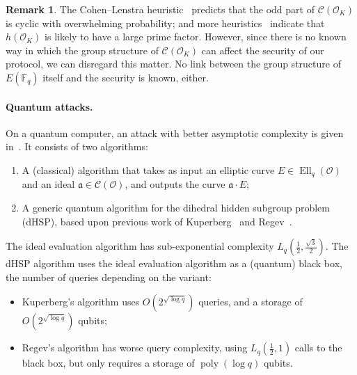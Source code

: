 \documentclass{article}
\newcommand{\F}{\mathbb{F}}
\newcommand{\Cl}{\mathcal{C}}
\renewcommand{\O}{\mathcal{O}}
\renewcommand{\frak}{\mathfrak}
\theoremstyle{definition}
\newtheorem{remark}[theorem]{Remark}
\DeclareMathOperator{\Ell}{Ell}
\DeclareMathOperator{\poly}{poly}
\begin{document}
\begin{remark}
  The Cohen--Lenstra heuristic~\cite{10.1007/BFb0099440} predicts that
  the odd part of $\Cl(\O_K)$ is cyclic with overwhelming
  probability; and more heuristics~\cite{10.1007/3-540-44448-3_18}
  indicate that $h(\O_K)$ is likely to have a large prime factor.
  However, since there is no known way in which the group structure of
  $\Cl(\O_K)$ can affect the security of our protocol, we can 
  disregard this matter. No link between the group structure
	of $E(\F_q)$ itself and the security is known, either.
\end{remark}

\paragraph{Quantum attacks.}
On a quantum computer, an attack with better asymptotic complexity is
given in~\cite{childs2014constructing}. It consists of two algorithms:
\begin{enumerate}
\item A (classical) algorithm that takes as input an elliptic curve
  $E∈\Ell_q(\O)$ and an ideal $\frak a∈\Cl(\O)$, and outputs the curve
  $\frak a·E$;
\item A generic quantum algorithm for the dihedral hidden subgroup
  problem (dHSP), based upon previous work of Kuperberg~\cite{Kup} and
  Regev~\cite{regev04}.
\end{enumerate}

The ideal evaluation algorithm has sub-exponential complexity
$L_q(\frac{1}{2},\frac{\sqrt{3}}{2})$.  The dHSP algorithm uses the
ideal evaluation algorithm as a (quantum) black box, the number of
queries depending on the variant:
\begin{itemize}
\item Kuperberg's algorithm uses $O(2^{\sqrt{\log q}})$ queries, and a
  storage of $O(2^{\sqrt{\log q}})$ qubits;
\item Regev's algorithm has worse query complexity, using
  $L_q(\frac{1}{2},1)$ calls to the black box, but only requires a
  storage of $\poly(\log q)$ qubits.
\end{itemize}
\end{document}
